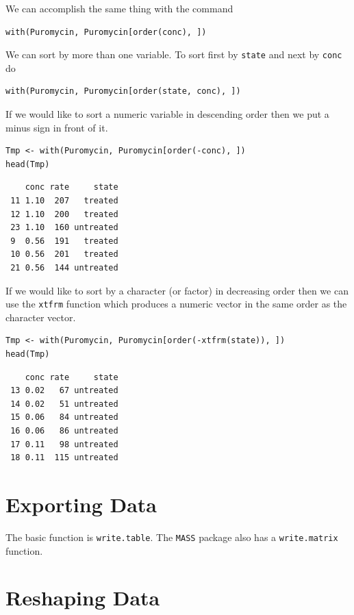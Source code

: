 \documentclass[captions=tableheading]{scrbook}
\begin{document}
We can accomplish the same thing with the command 


\begin{verbatim}
with(Puromycin, Puromycin[order(conc), ])
\end{verbatim}

We can sort by more than one variable. To sort first by \texttt{state} and next by \texttt{conc} do 


\begin{verbatim}
with(Puromycin, Puromycin[order(state, conc), ])
\end{verbatim}

If we would like to sort a numeric variable in descending order then we put a minus sign in front of it. 


\begin{verbatim}
Tmp <- with(Puromycin, Puromycin[order(-conc), ])
head(Tmp)
\end{verbatim}

\begin{verbatim}
    conc rate     state
 11 1.10  207   treated
 12 1.10  200   treated
 23 1.10  160 untreated
 9  0.56  191   treated
 10 0.56  201   treated
 21 0.56  144 untreated
\end{verbatim}

If we would like to sort by a character (or factor) in decreasing order then we can use the \texttt{xtfrm} function which produces a numeric vector in the same order as the character vector.


\begin{verbatim}
Tmp <- with(Puromycin, Puromycin[order(-xtfrm(state)), ])
head(Tmp)
\end{verbatim}

\begin{verbatim}
    conc rate     state
 13 0.02   67 untreated
 14 0.02   51 untreated
 15 0.06   84 untreated
 16 0.06   86 untreated
 17 0.11   98 untreated
 18 0.11  115 untreated
\end{verbatim}
\section{Exporting Data \label{sec:Exporting-a-Data}}
\label{sec-20-5}


The basic function is \texttt{write.table}. The \texttt{MASS} package also has a \texttt{write.matrix} function.
\section{Reshaping Data \label{sec:Reshaping-a-Data}}
\label{sec-20-6}
\end{document}
